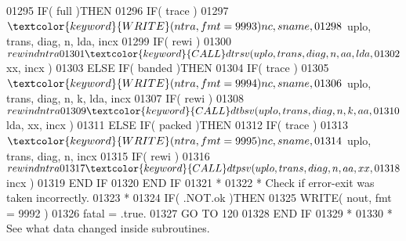 \begin{DoxyCode}
01295                            \textcolor{keywordflow}{IF}( full )\textcolor{keywordflow}{THEN}
01296                               \textcolor{keywordflow}{IF}( trace )
01297      $                           \textcolor{keyword}{WRITE}( ntra, fmt = 9993 )nc, sname,
01298      $                           uplo, trans, diag, n, lda, incx
01299                               \textcolor{keywordflow}{IF}( rewi )
01300      $                           rewind ntra
01301                               \textcolor{keyword}{CALL }dtrsv( uplo, trans, diag, n, aa, lda,
01302      $                                    xx, incx )
01303                            \textcolor{keywordflow}{ELSE} \textcolor{keywordflow}{IF}( banded )\textcolor{keywordflow}{THEN}
01304                               \textcolor{keywordflow}{IF}( trace )
01305      $                           \textcolor{keyword}{WRITE}( ntra, fmt = 9994 )nc, sname,
01306      $                           uplo, trans, diag, n, k, lda, incx
01307                               \textcolor{keywordflow}{IF}( rewi )
01308      $                           rewind ntra
01309                               \textcolor{keyword}{CALL }dtbsv( uplo, trans, diag, n, k, aa,
01310      $                                    lda, xx, incx )
01311                            \textcolor{keywordflow}{ELSE} \textcolor{keywordflow}{IF}( packed )\textcolor{keywordflow}{THEN}
01312                               \textcolor{keywordflow}{IF}( trace )
01313      $                           \textcolor{keyword}{WRITE}( ntra, fmt = 9995 )nc, sname,
01314      $                           uplo, trans, diag, n, incx
01315                               \textcolor{keywordflow}{IF}( rewi )
01316      $                           rewind ntra
01317                               \textcolor{keyword}{CALL }dtpsv( uplo, trans, diag, n, aa, xx,
01318      $                                    incx )
01319 \textcolor{keywordflow}{                           END IF}
01320 \textcolor{keywordflow}{                        END IF}
01321 \textcolor{comment}{*}
01322 \textcolor{comment}{*                       Check if error-exit was taken incorrectly.}
01323 \textcolor{comment}{*}
01324                         \textcolor{keywordflow}{IF}( .NOT.ok )\textcolor{keywordflow}{THEN}
01325                            \textcolor{keyword}{WRITE}( nout, fmt = 9992 )
01326                            fatal = .true.
01327                            \textcolor{keywordflow}{GO TO} 120
01328 \textcolor{keywordflow}{                        END IF}
01329 \textcolor{comment}{*}
01330 \textcolor{comment}{*                       See what data changed inside subroutines.}

\end{DoxyCode}
